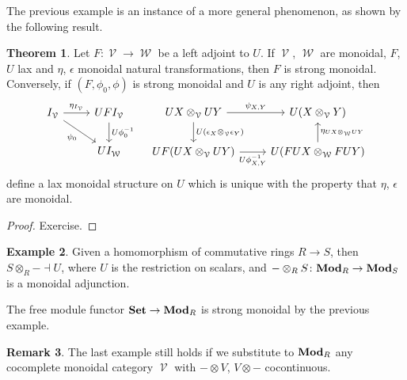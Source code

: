 \documentclass[a4paper,11pt,oneside,openany]{scrbook}
\newcommand{\catname}[1]{{\normalfont\textbf{#1}}}
\newcommand{\Set}{\catname{Set}}
\newcommand{\Mod}{\catname{Mod}}
\DeclareMathOperator{\V}{\mathcal{V}}
\DeclareMathOperator{\W}{\mathcal{W}}
\theoremstyle{definition}
\newtheorem{thm}{Theorem}[section] %
\theoremstyle{definition}
\newtheorem{rmk}[thm]{Remark}
\newtheorem{exmp}[thm]{Example}
\begin{document}
The previous example is an instance of a more general phenomenon, as shown by the following result.

\begin{thm}
    Let $F\colon\V\rightarrow\W$ be a left adjoint to $U$. If $\V$, $\W$ are monoidal, $F$, $U$ lax and $\eta$, $\epsilon$ monoidal natural transformations, then $F$ is strong monoidal. Conversely, if $(F,\phi_0,\phi)$ is strong monoidal and $U$ is any right adjoint, then
    \[
    \begin{tikzcd}
        I_{\V}\ar[r, "\eta_{I_{\V}}"]\ar[dr, "\psi_0", swap]
        & UFI_{\V}\ar[d, "U\phi_0^{-1}"] \\
        & UI_{\W}
    \end{tikzcd}
    \quad
    \begin{tikzcd}
        UX\otimes_{\V}UY\ar[r, "\psi_{X,Y}"]\ar[d, "U(\epsilon_X\otimes_{\V}\epsilon_Y)"]
        & U(X\otimes_{\V}Y) \\
        UF(UX\otimes_{\V}UY)\ar[r, "U\phi^{-1}_{X,Y}", swap]
        & U(FUX\otimes_{\W}FUY)\ar[u, "\eta_{UX\otimes_{\W}UY}", swap]
    \end{tikzcd}
    \]
    define a lax monoidal structure on $U$ which is unique with the property that $\eta$, $\epsilon$ are monoidal.
\end{thm}

\begin{proof}
    Exercise.
\end{proof}

\begin{exmp}
    Given a homomorphism of commutative rings $R\rightarrow S$, then $S\otimes_R-\dashv U$, where $U$ is the restriction on scalars, and $-\otimes_RS\colon\Mod_R\rightarrow\Mod_S$ is a monoidal adjunction.

    The free module functor $\Set\rightarrow\Mod_R$ is strong monoidal by the previous example.
\end{exmp}

\begin{rmk}
    The last example still holds if we substitute to $\Mod_R$ any cocomplete monoidal category $\V$ with $-\otimes V$, $V\otimes -$ cocontinuous.
\end{rmk}
\end{document}
